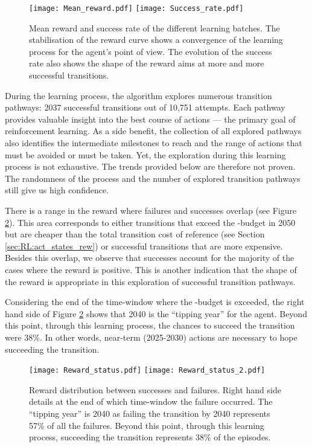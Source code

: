 \begin{figure}[!htbp]
\centering
\texttt{[image: Mean\_reward.pdf]}
\texttt{[image: Success\_rate.pdf]}
\caption{Mean reward and success rate of the different learning batches. The stabilisation of the reward curve shows a convergence of the learning process for the agent's point of view. The evolution of the success rate also shows the shape of the reward aims at more and more successful transitions.}
\label{fig:reward_success}
\end{figure}

During the learning process, the algorithm explores numerous transition pathways: 2037 successful transitions out of 10,751 attempts. Each pathway provides valuable insight into the best course of actions --- the primary goal of reinforcement learning. As a side benefit, the collection of all explored pathways also identifies the intermediate milestones to reach and the range of actions that must be avoided or must be taken. Yet, the exploration during this learning process is not exhaustive. The trends provided below are therefore not proven. The randomness of the process and the number of explored transition pathways still give us high confidence.

There is a range in the reward where failures and successes overlap (see Figure \ref{fig:reward_status}). This area corresponds to either transitions that exceed the -budget in 2050 but are cheaper than the total transition cost of reference (see Section \ref{sec:RL:act_states_rew}) or successful transitions that are more expensive. Besides this overlap, we observe that successes account for the majority of the cases where the reward is positive. This is another indication that the shape of the reward is appropriate in this exploration of successful transition pathways.

Considering the end of the time-window where the -budget is exceeded, the right hand side of Figure \ref{fig:reward_status} shows that 2040 is the ``tipping year'' for the agent. Beyond this point, through this learning process, the chances to succeed the transition were 38\%. In other words, near-term (2025-2030) actions are necessary to hope succeeding the transition.

\begin{figure}[!htbp]
\centering
\texttt{[image: Reward\_status.pdf]}
\texttt{[image: Reward\_status\_2.pdf]}
\caption{Reward distribution between successes and failures. Right hand side details at the end of which time-window the failure occurred. The ``tipping year'' is 2040 as failing the transition by 2040 represents 57\% of all the failures. Beyond this point, through this learning process, succeeding the transition represents 38\% of the episodes.}
\label{fig:reward_status}
\end{figure}

